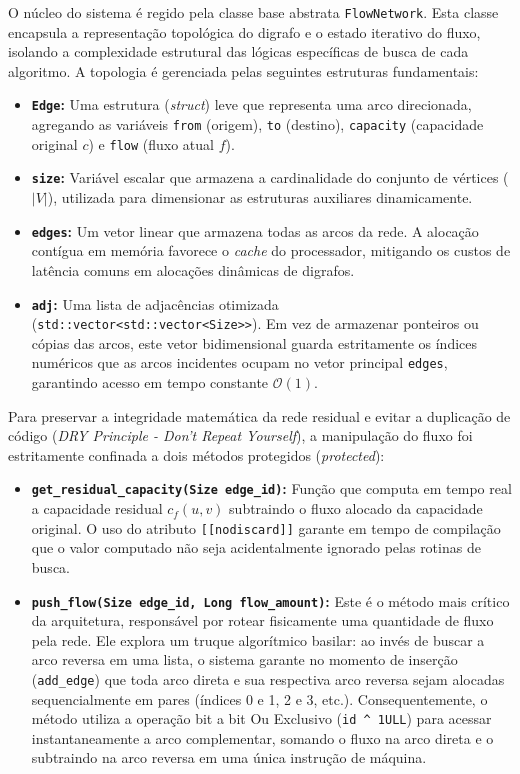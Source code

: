 \documentclass[12pt,a4paper]{article}
\begin{document}
O núcleo do sistema é regido pela classe base abstrata \lstinline{FlowNetwork}. Esta classe encapsula a representação topológica do digrafo e o estado iterativo do fluxo, isolando a complexidade estrutural das lógicas específicas de busca de cada algoritmo. A topologia é gerenciada pelas seguintes estruturas fundamentais:

\begin{itemize}
    \item \textbf{\lstinline{Edge}:} Uma estrutura (\textit{struct}) leve que representa uma arco direcionada, agregando as variáveis \lstinline{from} (origem), \lstinline{to} (destino), \lstinline{capacity} (capacidade original $c$) e \lstinline{flow} (fluxo atual $f$).
    \item \textbf{\lstinline{size}:} Variável escalar que armazena a cardinalidade do conjunto de vértices ($|V|$), utilizada para dimensionar as estruturas auxiliares dinamicamente.
    \item \textbf{\lstinline{edges}:} Um vetor linear que armazena todas as arcos da rede. A alocação contígua em memória favorece o \textit{cache} do processador, mitigando os custos de latência comuns em alocações dinâmicas de digrafos.
    \item \textbf{\lstinline{adj}:} Uma lista de adjacências otimizada (\lstinline{std::vector<std::vector<Size>>}). Em vez de armazenar ponteiros ou cópias das arcos, este vetor bidimensional guarda estritamente os índices numéricos que as arcos incidentes ocupam no vetor principal \lstinline{edges}, garantindo acesso em tempo constante $\mathcal{O}(1)$.
\end{itemize}

Para preservar a integridade matemática da rede residual e evitar a duplicação de código (\textit{DRY Principle - Don't Repeat Yourself}), a manipulação do fluxo foi estritamente confinada a dois métodos protegidos (\textit{protected}):

\begin{itemize}
    \item \textbf{\lstinline{get_residual_capacity(Size edge_id)}:} Função que computa em tempo real a capacidade residual $c_f(u,v)$ subtraindo o fluxo alocado da capacidade original. O uso do atributo \lstinline{[[nodiscard]]} garante em tempo de compilação que o valor computado não seja acidentalmente ignorado pelas rotinas de busca.
    \item \textbf{\lstinline{push_flow(Size edge_id, Long flow_amount)}:} Este é o método mais crítico da arquitetura, responsável por rotear fisicamente uma quantidade de fluxo pela rede. Ele explora um truque algorítmico basilar: ao invés de buscar a arco reversa em uma lista, o sistema garante no momento de inserção (\lstinline{add_edge}) que toda arco direta e sua respectiva arco reversa sejam alocadas sequencialmente em pares (índices 0 e 1, 2 e 3, etc.). Consequentemente, o método utiliza a operação bit a bit Ou Exclusivo (\lstinline{id ^ 1ULL}) para acessar instantaneamente a arco complementar, somando o fluxo na arco direta e o subtraindo na arco reversa em uma única instrução de máquina.
\end{itemize}
\end{document}
